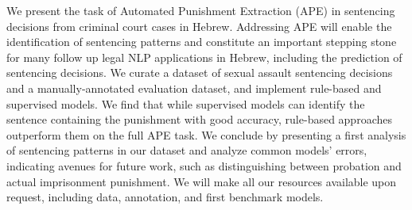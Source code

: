 We present the task of Automated Punishment Extraction (APE) in sentencing decisions from criminal court cases in Hebrew. Addressing APE will enable the identification of sentencing patterns and constitute an important stepping stone for many follow up legal NLP applications in Hebrew, including the prediction of sentencing decisions. We curate a dataset of sexual assault sentencing decisions and a manually-annotated evaluation dataset, and implement rule-based and supervised models. We find that while supervised models can identify the sentence containing the punishment with good accuracy, rule-based approaches outperform them on the full APE task. We conclude by presenting a first analysis of sentencing patterns in our dataset and analyze common models' errors, indicating avenues for future work, such as distinguishing between probation and actual imprisonment punishment. We will make all our resources available upon request, including data, annotation, and first benchmark models.
